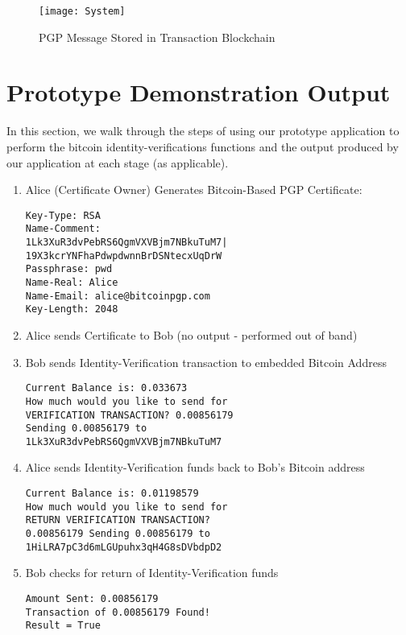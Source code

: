 \documentclass{llncs}
\begin{document}
\begin{figure}[h]
  \centering
  \captionsetup{justification=centering}
  \caption{PGP Message Stored in Transaction Blockchain}
  \texttt{[image: System]}
\end{figure}

\section{Prototype Demonstration Output}
In this section, we walk through the steps of using our prototype application to perform the bitcoin identity-verifications functions and the output produced by our application at each stage (as applicable).  

\begin{enumerate}
\item Alice (Certificate Owner) Generates Bitcoin-Based PGP Certificate:
\begin{verbatim}
Key-Type: RSA
Name-Comment: 
1Lk3XuR3dvPebRS6QgmVXVBjm7NBkuTuM7|
19X3kcrYNFhaPdwpdwnnBrDSNtecxUqDrW
Passphrase: pwd
Name-Real: Alice
Name-Email: alice@bitcoinpgp.com
Key-Length: 2048
\end{verbatim}

\item Alice sends Certificate to Bob (no output - performed out of band)
\item Bob sends Identity-Verification transaction to embedded Bitcoin Address
\begin{verbatim}
Current Balance is: 0.033673
How much would you like to send for 
VERIFICATION TRANSACTION? 0.00856179
Sending 0.00856179 to 
1Lk3XuR3dvPebRS6QgmVXVBjm7NBkuTuM7
\end{verbatim}

\item Alice sends Identity-Verification funds back to Bob's Bitcoin address
\begin{verbatim}
Current Balance is: 0.01198579
How much would you like to send for 
RETURN VERIFICATION TRANSACTION? 
0.00856179 Sending 0.00856179 to
1HiLRA7pC3d6mLGUpuhx3qH4G8sDVbdpD2
\end{verbatim}

\item Bob checks for return of Identity-Verification funds

\begin{verbatim}
Amount Sent: 0.00856179
Transaction of 0.00856179 Found!
Result = True
\end{verbatim}



\end{enumerate}
\end{document}
